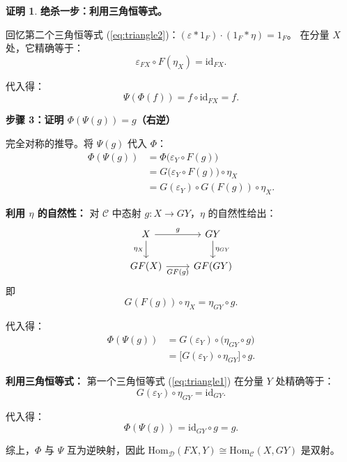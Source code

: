 \documentclass[12pt,a4paper]{ctexart}
\theoremstyle{definition}
\newtheorem*{proof*}{证明}
\newcommand{\Hom}{\mathrm{Hom}}
\newcommand{\id}{\mathrm{id}}
\begin{document}
\begin{proof*}
\textbf{绝杀一步：利用三角恒等式。}

回忆第二个三角恒等式 (\ref{eq:triangle2})：$(\varepsilon \ast 1_F) \cdot (1_F \ast \eta) = 1_F$。
在分量 $X$ 处，它精确等于：
\begin{equation}\label{eq:triangle2-component}
\varepsilon_{FX} \circ F(\eta_X) = \id_{FX}.
\end{equation}

代入得：
\[
\Psi(\Phi(f)) = f \circ \id_{FX} = f.
\]

\medskip
\noindent\textbf{步骤 3：证明 $\Phi(\Psi(g)) = g$（右逆）}

完全对称的推导。将 $\Psi(g)$ 代入 $\Phi$：
\begin{align*}
\Phi(\Psi(g)) &= \Phi\big(\varepsilon_Y \circ F(g)\big) \\
&= G\big(\varepsilon_Y \circ F(g)\big) \circ \eta_X \\
&= G(\varepsilon_Y) \circ G(F(g)) \circ \eta_X.
\end{align*}

\textbf{利用 $\eta$ 的自然性：} 对 $\mathcal{C}$ 中态射 $g: X \to GY$，$\eta$ 的自然性给出：
\[
\begin{tikzcd}
X \ar[r, "g"] \ar[d, "\eta_X"'] & GY \ar[d, "\eta_{GY}"] \\
GF(X) \ar[r, "GF(g)"'] & GF(GY)
\end{tikzcd}
\]
即
\begin{equation}\label{eq:naturality-eta}
G(F(g)) \circ \eta_X = \eta_{GY} \circ g.
\end{equation}

代入得：
\begin{align*}
\Phi(\Psi(g)) &= G(\varepsilon_Y) \circ \big(\eta_{GY} \circ g\big) \\
&= \big[G(\varepsilon_Y) \circ \eta_{GY}\big] \circ g.
\end{align*}

\textbf{利用三角恒等式：} 第一个三角恒等式 (\ref{eq:triangle1}) 在分量 $Y$ 处精确等于：
\begin{equation}\label{eq:triangle1-component}
G(\varepsilon_Y) \circ \eta_{GY} = \id_{GY}.
\end{equation}

代入得：
\[
\Phi(\Psi(g)) = \id_{GY} \circ g = g.
\]

\medskip
\noindent 综上，$\Phi$ 与 $\Psi$ 互为逆映射，因此 $\Hom_{\mathcal{D}}(FX, Y) \cong \Hom_{\mathcal{C}}(X, GY)$ 是双射。
\end{proof*}

\end{document}
